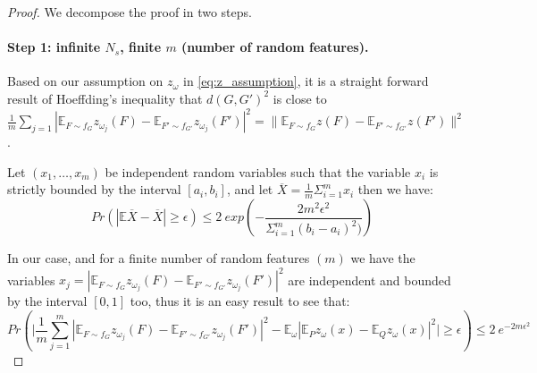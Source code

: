 \begin{proof}
We decompose the proof in two steps.
\paragraph{Step 1: infinite $N_s$, finite $m$ (number of random features).} Based on our assumption on $z_\omega$ in \eqref{eq:z_assumption}, it is a straight forward result of Hoeffding's inequality that  $d(G, G')^2$ is close to $\frac{1}{m} \sum_{j=1} | \mathbb{E}_{F \sim f_G} z_{\omega_j}(F) - \mathbb{E}_{F' \sim f_{G'}} z_{\omega_j}(F') |^2 = \| \mathbb{E}_{F \sim f_G} z(F) - \mathbb{E}_{F' \sim f_{G'}} z(F')\|^2$.  
\begin{lemma} 
Let $(x_1,\ldots, x_m)$ be independent random variables such that the variable $x_i$ is strictly bounded by the interval $[a_i , b_i]$, and let $\overline{X}=\frac{1}{m}\Sigma_{i=1}^{m}x_i$ then we have:
\begin{equation}
\label{eq:Hoeffding}
    Pr(|\mathbb{E}\overline{X}-\overline{X}|\geq \epsilon)\leq 2~ exp (-\frac{2m^2\epsilon^2}{\Sigma_{i=1}^m(b_i-a_i)^2)})
\end{equation}

\end{lemma}
In our case, and for a finite number of random features $(m)$ we have the variables $x_j=| \mathbb{E}_{F \sim f_G} z_{\omega_j}(F) - \mathbb{E}_{F' \sim f_{G'}} z_{\omega_j}(F') |^2 $ are independent and bounded by the interval $[0,1]$ too, thus it is an easy result to see that:
\begin{equation}
    Pr(\Big|\frac{1}{m} \sum_{j=1}^m | \mathbb{E}_{F \sim f_G} z_{\omega_j}(F) - \mathbb{E}_{F' \sim f_{G'}} z_{\omega_j}(F') |^2 - \mathbb{E}_{\omega}  | \mathbb{E}_P z_\omega(x) - \mathbb{E}_Q z_\omega(x) |^2 \Big| \geq \epsilon) \leq 2~ e^{ -2m\epsilon^2}
\end{equation}


\end{proof}
